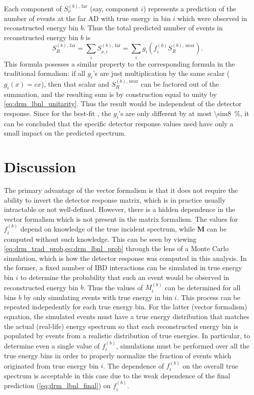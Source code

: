 Each component of $S_\nu^{(b),\,\text{far}}$ (say, component $i$) represents
a prediction of
the number of \nuebar{} events at the far AD with true energy in bin $i$
which were observed in reconstructed energy bin $b$.
Thus the total predicted number of events in reconstructed energy bin $b$ is
\begin{equation}\label{eq:drm_lbnl_final}
    S_R^{(b),\,\text{far}} = \sum_i S_{\nu,i}^{(b),\,\text{far}}
    = \sum_i g_i(f_i^{(b)}S_R^{(b),\,\text{near}}).
\end{equation}
This formula posesses a similar property to the corresponding formula
in the traditional formalism:
if all $g_i$'s are just multiplication by the same scalar ($g_i(x) = cx$),
then that scalar and $S_R^{(b),\,\text{near}}$
can be factored out of the summation,
and the resulting sum is by construction
equal to unity by \cref{eq:drm_lbnl_unitarity}.
Thus the result would be independent of the detector response.
Since for the best-fit \thetaot{}, the $g_i$'s are only different
by at most \SI{\sim8}{\percent},
it can be concluded that the specific detector response values used
have only a small impact on the predicted spectrum.

\section{Discussion}
\label{sec:drm_comparison}

The primary advantage of the vector formalism
is that it does not require the ability to invert the detector response matrix,
which is in practice usually intractable or not well-defined.
However, there is a hidden dependence in the vector formalism
which is not present in the matrix formalism.
The values for $f_i^{(b)}$ depend on knowledge of
the true incident \nuebar{} spectrum,
while $\mathbf{M}$ can be computed without such knowledge.
This can be seen by viewing \cref{eq:drm_trad_prob,eq:drm_lbnl_prob}
through the lens of a Monte Carlo simulation,
which is how the detector response was computed in this analysis.
In the former, a fixed number of IBD interactions can be simulated
in true \nuebar{} energy bin $i$ to determine the probability
that such an event would be observed in reconstructed energy bin $b$.
Thus the values of $M_i^{(b)}$ can be determined for all bins $b$
by only simulating events with true energy in bin $i$.
This process can be repeated indepedently for each true energy bin.
For the latter (vector formalism) equation,
the simulated events must have a true \nuebar{} energy distribution
that matches the actual (real-life) \nuebar{} energy spectrum
so that each reconstructed energy bin is populated
by events from a realistic distribution of true energies.
In particular, to determine even a single value of $f_i^{(b)}$,
simulations must be performed over all the true energy bins
in order to properly normalize the fraction of events
which originated from true energy bin $i$.
The dependence of $f_i^{(b)}$ on the overall true \nuebar{} spectrum
is acceptable in this case
due to the weak dependence of the final prediction (\cref{eq:drm_lbnl_final})
on $f_i^{(b)}$.

